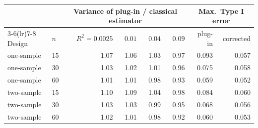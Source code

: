 \begin{tabular}{llrrrrrr}
\toprule
 & & \multicolumn{4}{c}{Variance of plug-in / classical estimator} & \multicolumn{2}{c}{Max.\ Type I error} \\
\cmidrule(lr){3-6}\cmidrule(lr){7-8}
Design & $n$ & $R^2=0.0025$ & $0.01$ & $0.04$ & $0.09$ & plug-in & corrected \\
\midrule
one-sample & 15 & 1.07 & 1.06 & 1.03 & 0.97 & 0.093 & 0.057 \\
one-sample & 30 & 1.03 & 1.02 & 1.01 & 0.96 & 0.075 & 0.058 \\
one-sample & 60 & 1.01 & 1.01 & 0.98 & 0.93 & 0.059 & 0.052 \\
two-sample & 15 & 1.10 & 1.09 & 1.04 & 0.98 & 0.084 & 0.060 \\
two-sample & 30 & 1.03 & 1.03 & 0.99 & 0.95 & 0.068 & 0.056 \\
two-sample & 60 & 1.02 & 1.01 & 0.98 & 0.92 & 0.060 & 0.053 \\
\bottomrule
\end{tabular}
